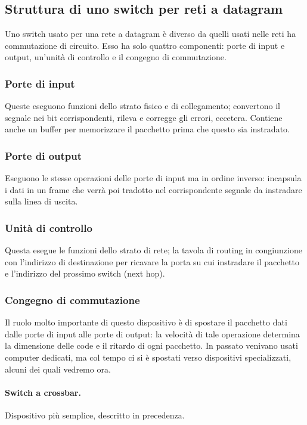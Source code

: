     \subsection{Struttura di uno switch per reti a datagram}
        Uno switch usato per una rete a datagram è diverso da quelli usati nelle reti ha commutazione di circuito. Esso ha solo quattro componenti: porte di input e output, un'unità di controllo e il congegno di commutazione.
        
        \subsubsection{Porte di input}
            Queste eseguono funzioni dello strato fisico e di collegamento; convertono il segnale nei bit corrispondenti, rileva e corregge gli errori, eccetera. Contiene anche un buffer per memorizzare il pacchetto prima che questo sia instradato.
            
        \subsubsection{Porte di output}
            Eseguono le stesse operazioni delle porte di input ma in ordine inverso: incapsula i dati in un frame che verrà poi tradotto nel corrispondente segnale da instradare sulla linea di uscita.
            
        \subsubsection{Unità di controllo}
            Questa esegue le funzioni dello strato di rete; la tavola di routing in congiunzione con l'indirizzo di destinazione per ricavare la porta su cui instradare il pacchetto e l'indirizzo del prossimo switch (next hop).
            
        \subsubsection{Congegno di commutazione}
            Il ruolo molto  importante di questo dispositivo è di spostare il pacchetto dati dalle porte di input alle porte di output: la velocità di tale operazione determina la dimensione delle code e il ritardo di ogni pacchetto. In passato venivano usati computer dedicati, ma col tempo ci si è spostati verso dispositivi specializzati, alcuni dei quali vedremo ora.
            
            \paragraph{Switch a crossbar.} Dispositivo più semplice, descritto in precedenza.
            
